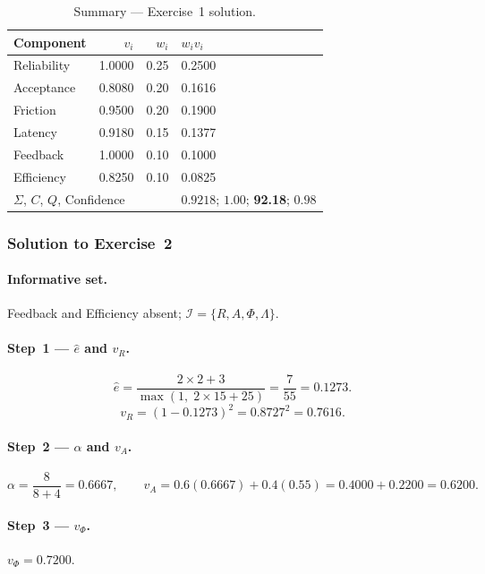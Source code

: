 \documentclass[11pt,a4paper]{article}
\newcommand{\calI}{\mathcal{I}}
\begin{document}
\begin{table}[h!]
\centering
\caption{Summary --- Exercise~1 solution.}
\begin{tabular}{@{}lrrl@{}}
\toprule
Component & $v_i$ & $w_i$ & $w_iv_i$ \\
\midrule
Reliability  & 1.0000 & 0.25 & 0.2500 \\
Acceptance   & 0.8080 & 0.20 & 0.1616 \\
Friction     & 0.9500 & 0.20 & 0.1900 \\
Latency      & 0.9180 & 0.15 & 0.1377 \\
Feedback     & 1.0000 & 0.10 & 0.1000 \\
Efficiency   & 0.8250 & 0.10 & 0.0825 \\
\midrule
\multicolumn{3}{l}{$\Sigma$, $C$, $Q$, Confidence}
  & $0.9218$;\; $1.00$;\; \textbf{92.18};\; $0.98$ \\
\bottomrule
\end{tabular}
\end{table}

\subsubsection*{Solution to Exercise~2}

\paragraph{Informative set.}
Feedback and Efficiency absent; $\calI=\{R,A,\Phi,\Lambda\}$.

\paragraph{Step~1 --- $\hat{e}$ and $v_R$.}
\[
  \hat{e} = \frac{2\times2+3}{\max(1,\;2\times15+25)} = \frac{7}{55} = 0.1273.
\]
\[
  v_R = (1-0.1273)^2 = 0.8727^2 = 0.7616.
\]

\paragraph{Step~2 --- $\alpha$ and $v_A$.}
\[
  \alpha = \frac{8}{8+4} = 0.6667, \qquad
  v_A = 0.6(0.6667)+0.4(0.55) = 0.4000+0.2200 = 0.6200.
\]

\paragraph{Step~3 --- $v_\Phi$.} $v_\Phi = 0.7200$.
\end{document}
